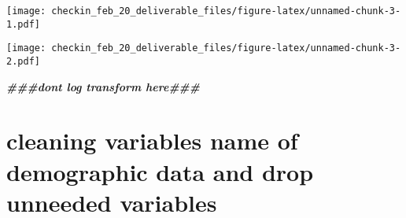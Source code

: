\documentclass[
]{article}
\newenvironment{Shaded}{\begin{snugshade}}{\end{snugshade}}
\newcommand{\CommentTok}[1]{\textcolor[rgb]{0.56,0.35,0.01}{\textit{#1}}}
\newcommand{\DocumentationTok}[1]{\textcolor[rgb]{0.56,0.35,0.01}{\textbf{\textit{#1}}}}
\newcommand{\FunctionTok}[1]{\textcolor[rgb]{0.13,0.29,0.53}{\textbf{#1}}}
\newcommand{\NormalTok}[1]{#1}
\newcommand{\SpecialCharTok}[1]{\textcolor[rgb]{0.81,0.36,0.00}{\textbf{#1}}}
\begin{document}
\begin{Shaded}
\end{Shaded}

\texttt{[image: checkin\_feb\_20\_deliverable\_files/figure-latex/unnamed-chunk-3-1.pdf]}

\begin{Shaded}
\end{Shaded}

\texttt{[image: checkin\_feb\_20\_deliverable\_files/figure-latex/unnamed-chunk-3-2.pdf]}

\begin{Shaded}
\begin{Highlighting}[]
\DocumentationTok{\#\#\#dont log transform here\#\#\#}
\end{Highlighting}
\end{Shaded}

\hypertarget{cleaning-variables-name-of-demographic-data-and-drop-unneeded-variables}{%
\section{cleaning variables name of demographic data and drop unneeded
variables}\label{cleaning-variables-name-of-demographic-data-and-drop-unneeded-variables}}
\end{document}
